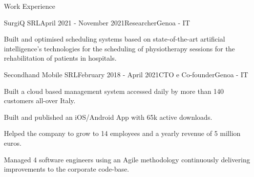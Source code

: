 \documentclass{resume} %
\begin{document}
\begin{rSection}{Work Experience}


\begin{rSubsection}{SurgiQ SRL}{April 2021 - November 2021}{Researcher}{Genoa - IT}
\item Built and optimised scheduling systems based on state-of-the-art artificial intelligence's technologies for the scheduling of physiotherapy sessions for the rehabilitation of patients in hospitals.
\end{rSubsection}

\begin{rSubsection}{Secondhand Mobile SRL}{February 2018 - April 2021}{CTO e Co-founder}{Genoa - IT}
\item Built a cloud based management system accessed daily by more than 140 customers all-over Italy. 
\item Built and published an iOS/Android App with 65k active downloads. 
\item Helped the company to grow to 14 employees and a yearly revenue of 5 million euros. 
\item Managed 4 software engineers using an Agile methodology continuously delivering improvements to the corporate code-base.
\end{rSubsection}




\end{rSection}



\end{document}
